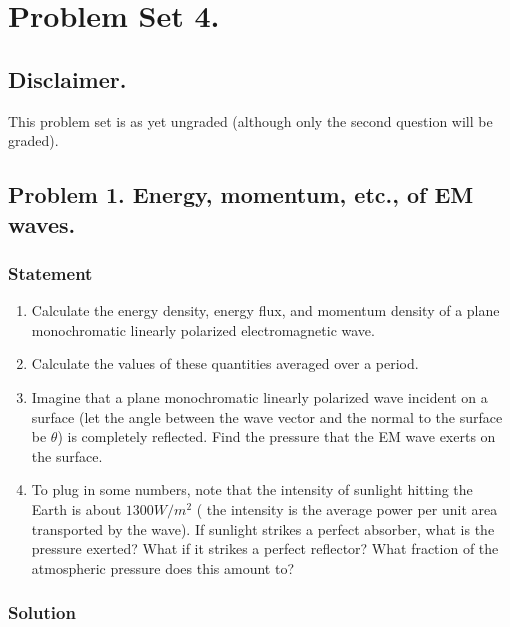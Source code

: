 %
%

\chapter{Problem Set 4.}
\label{chap:relElectroDynProblemSet4}
\date{Mar 3, 2011}

\beginArtWithToc

\section{Disclaimer.}

This problem set is as yet ungraded (although only the second question will be graded).

\section{Problem 1.  Energy, momentum, etc., of EM waves.}

\subsection{Statement}

\begin{enumerate}
\item Calculate the energy density, energy flux, and momentum density of a plane monochromatic linearly polarized electromagnetic wave.
\item Calculate the values of these quantities averaged over a period.
\item Imagine that a plane monochromatic linearly polarized wave incident on a surface (let the angle between the wave vector and the normal to the surface be $\theta$) is completely reflected.  Find the pressure that the EM wave exerts on the surface.
\item To plug in some numbers, note that the intensity of sunlight hitting the Earth is about $1300 W/m^2$ ( the intensity is the average power per unit area transported by the wave).  If sunlight strikes a perfect absorber, what is the pressure exerted?  What if it strikes a perfect reflector?  What fraction of the atmospheric pressure does this amount to?
\end{enumerate}
\subsection{Solution}
